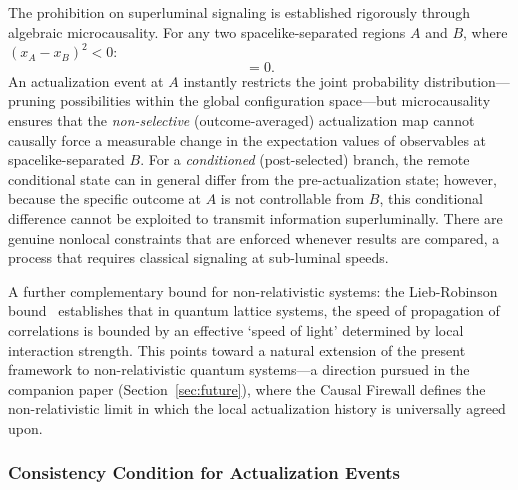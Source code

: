\documentclass[11pt,a4paper]{article}
\theoremstyle{plain}
\theoremstyle{definition}
\theoremstyle{remark}
\begin{document}
The prohibition on superluminal signaling is established rigorously through
algebraic microcausality. For any two spacelike-separated regions $A$ and $B$,
where $(x_A - x_B)^2 < 0$:
\begin{equation}
  [\hat{O}_A,\,\hat{O}_B] = 0.
\end{equation}
An actualization event at $A$ instantly restricts the joint probability
distribution---pruning possibilities within the global configuration space---but
microcausality ensures that the \emph{non-selective} (outcome-averaged)
actualization map cannot causally force a measurable change in the expectation
values of observables at spacelike-separated $B$. For a \emph{conditioned}
(post-selected) branch, the remote conditional state can in general differ from the
pre-actualization state; however, because the specific outcome at $A$ is not
controllable from $B$, this conditional difference cannot be exploited to transmit
information superluminally. There are genuine nonlocal constraints that are
enforced whenever results are compared, a process that requires classical signaling
at sub-luminal speeds.

A further complementary bound for non-relativistic systems: the Lieb-Robinson
bound~\citep{LiebRobinson1972} establishes that in quantum lattice systems, the
speed of propagation of correlations is bounded by an effective `speed of light'
determined by local interaction strength. This points toward a natural extension of
the present framework to non-relativistic quantum systems---a direction pursued in
the companion paper (Section~\ref{sec:future}), where the Causal Firewall defines
the non-relativistic limit in which the local actualization history is universally
agreed upon.

\subsubsection{Consistency Condition for Actualization Events}
\label{sec:consistency}
\end{document}
